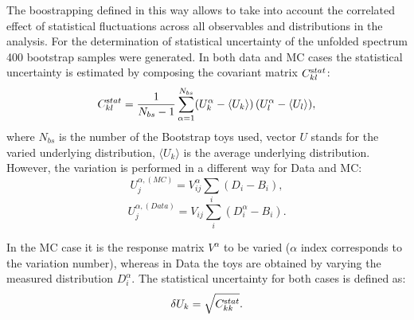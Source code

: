 The boostrapping defined in this way allows to take into account the correlated effect of statistical fluctuations across all observables and distributions in the analysis. For the determination of statistical uncertainty of the unfolded spectrum 400 bootstrap samples were generated. In both data and MC cases the statistical uncertainty is estimated by composing the covariant matrix $C_{kl}^{\textrm stat}$:
\begin{equation}
C_{kl}^{\textrm stat} = \frac{1}{N_{bs}-1} \sum_{\alpha=1}^{N_{bs}} (U^\alpha_k-\langle{U}_k\rangle) \, (U^\alpha_l-\langle{U}_l\rangle),
\label{eq:covexpr}
\end{equation}
where $N_{bs}$ is the number of the Bootstrap toys used, vector $U$ stands for the varied underlying distribution, $\langle{U}_k\rangle$ is the average underlying distribution. However, the variation is performed in a different way for Data and MC:
 \begin{equation*}
U_j^{\alpha,(MC)} = V_{ij}^\alpha \sum_{i} (D_i - B_i),
 \end{equation*}
  \begin{equation*}
U_j^{\alpha,(Data)}  = V_{ij} \sum_{i} (D_i^\alpha - B_i).
 \end{equation*}
 
 In the MC case it is the response matrix $V^\alpha$ to be varied ($\alpha$ index corresponds to the variation number), whereas in Data the toys are obtained by varying the measured distribution $D^\alpha_i$. The statistical uncertainty for both cases is defined as:
 \begin{equation}
 \delta U_k = \sqrt{C_{kk}^{\textrm stat}}.
 \end{equation}
 
